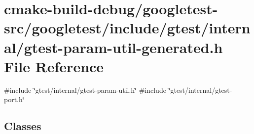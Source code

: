 \hypertarget{gtest-param-util-generated_8h}{}\section{cmake-\/build-\/debug/googletest-\/src/googletest/include/gtest/internal/gtest-\/param-\/util-\/generated.h File Reference}
\label{gtest-param-util-generated_8h}
{\ttfamily \#include \char`\"{}gtest/internal/gtest-\/param-\/util.\+h\char`\"{}}\newline
{\ttfamily \#include \char`\"{}gtest/internal/gtest-\/port.\+h\char`\"{}}\newline
\subsection*{Classes}
